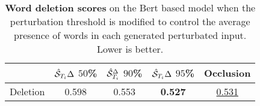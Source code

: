 \begin{table}[ht]
\centering
\begin{tabular}{l cccc}
\toprule
 & $\hat{\mathcal{S}}_{T_i}\Delta$ $50$\%  & $\hat{\mathcal{S}}_{T_i}^\Delta$ $90$\% & $\hat{\mathcal{S}}_{T_i}\Delta$ $95$\% & Occlusion \\
\midrule
Deletion & 0.598 & 0.553 & \textbf{0.527} &  \underline{0.531} \\
\bottomrule
\end{tabular}

\caption{\textbf{Word deletion scores} on the Bert based model when the perturbation threshold is modified to control the average presence of words in each generated perturbated input. Lower is better. 
}\label{app:sobol:word_deletion_bis}

\end{table}
